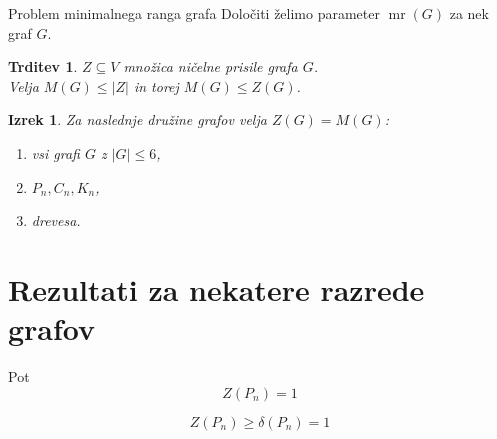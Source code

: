 \documentclass{beamer}
\newtheorem{trditev}[theorem]{Trditev}
\newtheorem{izrek}[theorem]{Izrek}
\DeclareMathOperator{\mr}{mr}
\begin{document}
\begin{frame}
    \begin{block}{Problem minimalnega ranga grafa}
        Določiti želimo parameter $\mr(G)$ za nek graf $G$.
    \end{block}
    
    \begin{trditev}
        $Z \subseteq V$ množica ničelne prisile grafa $G$. \\ 
        Velja $M(G) \leq |Z|$ in torej $M(G) \leq Z(G)$.
    \end{trditev}

    \begin{izrek}
        Za naslednje družine grafov velja $Z(G) = M(G)$:
        \begin{enumerate}
            \item vsi grafi $G$ z $|G| \leq 6$,
            \item $P_n, C_n, K_n$,
            \item drevesa.
        \end{enumerate}
    \end{izrek}
\end{frame}


\section{Rezultati za nekatere razrede grafov}

\begin{frame}{Pot}
    \[ Z(P_n) = 1 \]
    \begin{figure}
        \centering
    \end{figure}
    
    \[ Z(P_n) \geq \delta(P_n) = 1 \]
\end{frame}
\end{document}
